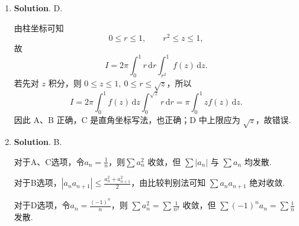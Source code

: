 \documentclass[../main.tex]{subfiles}
\begin{document}
\begin{enumerate}
          由于函数 \(xy\) 关于 \(x\) 或 \(y\) 都是奇函数，而 \(\cos x\sin y\) 关于 \(y\) 是奇函数，所以
          \[
              \iint\limits_D xy\,\mathrm{d}\sigma=0,\qquad
              \iint\limits_D \cos x\sin y\,\mathrm{d}\sigma=0.
          \]
          因此原积分为 \(0\).

    \item \textbf{Solution}. D.

          由柱坐标可知
          \[
              0\le r\le1,\qquad r^2\le z\le1,
          \]
          故
          \[
              I=2\pi\int_0^1 r\,\mathrm{d}r\int_{r^2}^1 f(z)\,\mathrm{d}z.
          \]
          若先对 \(z\) 积分，则 \(0\le z\le1,\ 0\le r\le\sqrt z\)，所以
          \[
              I=2\pi\int_0^1 f(z)\,\mathrm{d}z\int_0^{\sqrt z}r\,\mathrm{d}r
              =\pi\int_0^1 zf(z)\,\mathrm{d}z.
          \]
          因此 A、B 正确，C 是直角坐标写法，也正确；D 中上限应为 \(\sqrt z\)，故错误.

    \item \textbf{Solution}. B.

          对于A、C选项，令$a_n=\frac{1}{n}$，则\(\sum a_n^2\) 收敛，但 \(\sum |a_n|\) 与 \(\sum a_n\) 均发散.

          对于B选项，$|a_na_{n+1}|\le\frac{a_n^2+a_{n+1}^2}{2}$，由比较判别法可知 \(\sum a_na_{n+1}\) 绝对收敛.

          对于D选项，令$a_n=\frac{(-1)^n}{n}$，则 \(\sum a_n^2=\sum \frac{1}{n^2}\) 收敛，但 \(\sum (-1)^na_n = \sum \frac{1}{n}\) 发散.

\end{enumerate}
\end{document}
